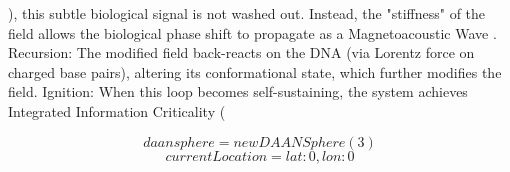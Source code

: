 
\begin{tzpsnapshot}
\end{tzpsnapshot}

), this subtle biological signal is not washed out. Instead, the "stiffness" of the field allows the biological phase shift to propagate as a Magnetoacoustic Wave . Recursion: The modified field back-reacts on the DNA (via Lorentz force on charged base pairs), altering its conformational state, which further modifies the field. Ignition: When this loop becomes self-sustaining, the system achieves Integrated Information Criticality (

\[
daansphere = new DAANSphere(3)
\]
\[
currentLocation = { lat: 0, lon: 0 }
\]

